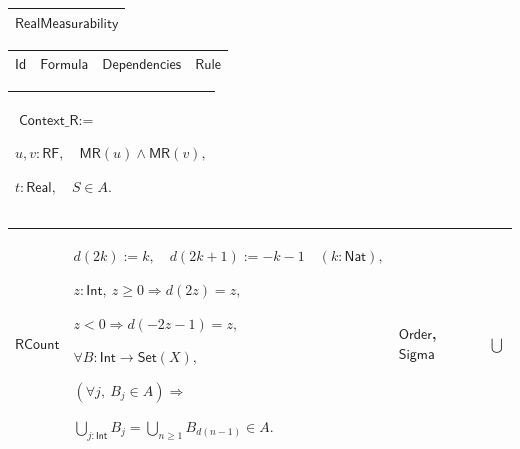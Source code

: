 \documentclass[11pt]{amsart}
\renewcommand{\arraystretch}{1.4}
\newlength{\FTCOneColumnBody}
\newlength{\FTCFourColumnBody}
\begin{document}
{\centering
\renewcommand{\arraystretch}{1.4}
\par\setlength{\parskip}{0pt}\nointerlineskip
\noindent
\begin{tabular}{|@{}>{\centering\arraybackslash}m{\FTCOneColumnBody}|}\hline
$\displaystyle \textsf{RealMeasurability}$\\ \hline
\end{tabular}%
\par\setlength{\parskip}{0pt}\nointerlineskip
\noindent
\begin{tabular}{|@{}>{\centering\arraybackslash}m{0.078431\FTCFourColumnBody}|>{\centering\arraybackslash}m{0.535947\FTCFourColumnBody}|>{\centering\arraybackslash}m{0.281045\FTCFourColumnBody}|>{\centering\arraybackslash}m{0.104575\FTCFourColumnBody}|}\hline
$\displaystyle \textsf{Id}$ & $\displaystyle \textsf{Formula}$ & $\displaystyle \textsf{Dependencies}$ & $\displaystyle \textsf{Rule}$\\ \hline
\end{tabular}%
\par\setlength{\parskip}{0pt}\nointerlineskip
\noindent
\begin{tabular}{|@{}>{\centering\arraybackslash}m{\FTCOneColumnBody}|}\hline
$\displaystyle \textsf{Context\_R}:=$\par
$\displaystyle u,v:\textsf{RF},\quad\textsf{MR}(u)\land\textsf{MR}(v),$\par
$\displaystyle t:\textsf{Real},\quad S\in A.$\\ \hline
\end{tabular}%
\par\setlength{\parskip}{0pt}\nointerlineskip
\noindent
\begin{tabular}{|@{}>{\centering\arraybackslash}m{0.078431\FTCFourColumnBody}|>{\centering\arraybackslash}m{0.535947\FTCFourColumnBody}|>{\centering\arraybackslash}m{0.281045\FTCFourColumnBody}|>{\centering\arraybackslash}m{0.104575\FTCFourColumnBody}|}\hline
\hypertarget{dct:RCount}{$\displaystyle \textsf{RCount}$} & $\displaystyle d(2k):=k,\quad d(2k+1):=-k-1\quad(k:\textsf{Nat}),$\par
$\displaystyle z:\textsf{Int},\ z\ge0\Rightarrow d(2z)=z,$\par
$\displaystyle z<0\Rightarrow d(-2z-1)=z,$\par
$\displaystyle \forall B:\textsf{Int}\to\textsf{Set}(X),$\par
$\displaystyle (\forall j,\ B_j\in A)\Rightarrow$\par
$\displaystyle \bigcup_{j:\textsf{Int}}B_j=\bigcup_{n\ge1}B_{d(n-1)}\in A.$ & \hyperlink{ax:Order}{$\displaystyle \textsf{Order}$}, \hyperlink{ax:Sigma}{$\displaystyle \textsf{Sigma}$} & $\displaystyle \bigcup$\\ \hline

\end{tabular}}
\end{document}

